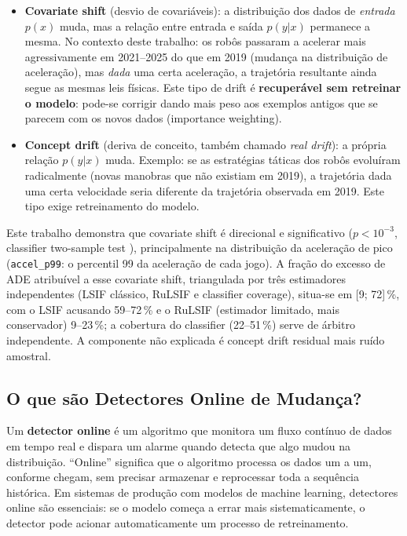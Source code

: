 \documentclass[11pt,a4paper]{article}
\begin{document}
\begin{itemize}[leftmargin=1.4em,itemsep=2pt]
    \item \textbf{Covariate shift} (desvio de covari\'aveis): a distribui\c{c}\~ao dos dados de \emph{entrada} $p(x)$ muda, mas a rela\c{c}\~ao entre entrada e sa\'ida $p(y|x)$ permanece a mesma. No contexto deste trabalho: os rob\^os passaram a acelerar mais agressivamente em 2021--2025 do que em 2019 (mudan\c{c}a na distribui\c{c}\~ao de acelera\c{c}\~ao), mas \emph{dada} uma certa acelera\c{c}\~ao, a trajet\'oria resultante ainda segue as mesmas leis f\'isicas. Este tipo de drift \'e \textbf{recuper\'avel sem retreinar o modelo}: pode-se corrigir dando mais peso aos exemplos antigos que se parecem com os novos dados (importance weighting).
    \item \textbf{Concept drift} (deriva de conceito, tamb\'em chamado \emph{real drift}): a pr\'opria rela\c{c}\~ao $p(y|x)$ muda. Exemplo: se as estrat\'egias t\'aticas dos rob\^os evolu\'iram radicalmente (novas manobras que n\~ao existiam em 2019), a trajet\'oria dada uma certa velocidade seria diferente da trajet\'oria observada em 2019. Este tipo exige retreinamento do modelo.
\end{itemize}

Este trabalho demonstra que covariate shift \'e direcional e significativo ($p\!<\!10^{-3}$, classifier two-sample test \cite{lopezpaz2017}), principalmente na distribui\c{c}\~ao da acelera\c{c}\~ao de pico (\texttt{accel\_p99}: o percentil 99 da acelera\c{c}\~ao de cada jogo). A fra\c{c}\~ao do excesso de ADE atribu\'ivel a esse covariate shift, triangulada por tr\^es estimadores independentes (LSIF cl\'assico, RuLSIF \cite{yamada2013} e classifier coverage), situa-se em [9; 72]\,\%, com o LSIF acusando 59--72\,\% e o RuLSIF (estimador limitado, mais conservador) 9--23\,\%; a cobertura do classifier (22--51\,\%) serve de \'arbitro independente. A componente n\~ao explicada \'e concept drift residual mais ru\'ido amostral.

\subsection*{O que s\~ao Detectores Online de Mudan\c{c}a?}

Um \textbf{detector online} \'e um algoritmo que monitora um fluxo cont\'inuo de dados em tempo real e dispara um alarme quando detecta que algo mudou na distribui\c{c}\~ao. ``Online'' significa que o algoritmo processa os dados um a um, conforme chegam, sem precisar armazenar e reprocessar toda a sequ\^encia hist\'orica. Em sistemas de produ\c{c}\~ao com modelos de machine learning, detectores online s\~ao essenciais: se o modelo come\c{c}a a errar mais sistematicamente, o detector pode acionar automaticamente um processo de retreinamento.
\end{document}
